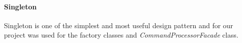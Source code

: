 \documentclass{article}[11]
\begin{document}
  	\paragraph{Singleton\\}
  	Singleton is one of the simplest and most useful design pattern and for our project was used for the factory classes and \emph{CommandProcessorFacade} class.
    
\printacronyms[include-classes=abbrev,name=Abbreviations]






\end{document}
